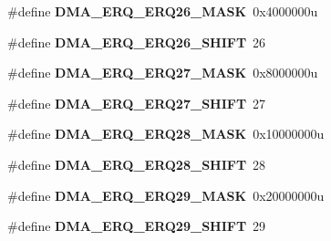 \begin{DoxyCompactItemize}
\item 
\hypertarget{group___d_m_a___register___masks_ga647b28752c5b2333a6b59499b1d61f93}{}\#define {\bfseries D\+M\+A\+\_\+\+E\+R\+Q\+\_\+\+E\+R\+Q26\+\_\+\+M\+A\+S\+K}~0x4000000u\label{group___d_m_a___register___masks_ga647b28752c5b2333a6b59499b1d61f93}

\item 
\hypertarget{group___d_m_a___register___masks_ga81e98e935ca848a262fb11232b3a7fe9}{}\#define {\bfseries D\+M\+A\+\_\+\+E\+R\+Q\+\_\+\+E\+R\+Q26\+\_\+\+S\+H\+I\+F\+T}~26\label{group___d_m_a___register___masks_ga81e98e935ca848a262fb11232b3a7fe9}

\item 
\hypertarget{group___d_m_a___register___masks_gabcedd5340a736da2328f195ae5c6462c}{}\#define {\bfseries D\+M\+A\+\_\+\+E\+R\+Q\+\_\+\+E\+R\+Q27\+\_\+\+M\+A\+S\+K}~0x8000000u\label{group___d_m_a___register___masks_gabcedd5340a736da2328f195ae5c6462c}

\item 
\hypertarget{group___d_m_a___register___masks_gad30dd53c2b8feca6d039b77b0337382e}{}\#define {\bfseries D\+M\+A\+\_\+\+E\+R\+Q\+\_\+\+E\+R\+Q27\+\_\+\+S\+H\+I\+F\+T}~27\label{group___d_m_a___register___masks_gad30dd53c2b8feca6d039b77b0337382e}

\item 
\hypertarget{group___d_m_a___register___masks_ga1077b8e72a52951a033b2d0f80eff642}{}\#define {\bfseries D\+M\+A\+\_\+\+E\+R\+Q\+\_\+\+E\+R\+Q28\+\_\+\+M\+A\+S\+K}~0x10000000u\label{group___d_m_a___register___masks_ga1077b8e72a52951a033b2d0f80eff642}

\item 
\hypertarget{group___d_m_a___register___masks_ga72eaa0dd85a3bf964b454150aee629be}{}\#define {\bfseries D\+M\+A\+\_\+\+E\+R\+Q\+\_\+\+E\+R\+Q28\+\_\+\+S\+H\+I\+F\+T}~28\label{group___d_m_a___register___masks_ga72eaa0dd85a3bf964b454150aee629be}

\item 
\hypertarget{group___d_m_a___register___masks_ga75c9f3b14e0dfff8665fb9036b65fccb}{}\#define {\bfseries D\+M\+A\+\_\+\+E\+R\+Q\+\_\+\+E\+R\+Q29\+\_\+\+M\+A\+S\+K}~0x20000000u\label{group___d_m_a___register___masks_ga75c9f3b14e0dfff8665fb9036b65fccb}

\item 
\hypertarget{group___d_m_a___register___masks_gaffd5a3d1dc87e0319bee8ccc4fe99f57}{}\#define {\bfseries D\+M\+A\+\_\+\+E\+R\+Q\+\_\+\+E\+R\+Q29\+\_\+\+S\+H\+I\+F\+T}~29\label{group___d_m_a___register___masks_gaffd5a3d1dc87e0319bee8ccc4fe99f57}


\end{DoxyCompactItemize}
